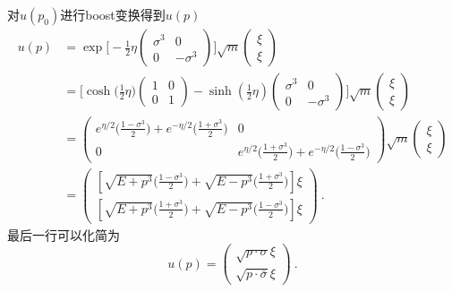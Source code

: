 \begin{exercise}{对$u(p_0)$进行boost变换得到$u(p)$}
\begin{align}\nonumber
u(p) & = \exp \bigg[ - \frac{1}{2} \eta \begin{pmatrix}
\sigma^3 & 0 \\ 
0 & - \sigma^3
\end{pmatrix} \bigg] \sqrt{m} \begin{pmatrix}
\xi \\ \xi
\end{pmatrix} \\ \nonumber
& = \bigg[ \cosh\big(\frac{1}{2}\eta\big)\begin{pmatrix}
1 & 0 \\
0 & 1
\end{pmatrix} - \sinh (\frac{1}{2}\eta) \begin{pmatrix}
\sigma^3 & 0 \\ \nonumber
0 & - \sigma^3
\end{pmatrix} \bigg]\sqrt{m} \begin{pmatrix}
\xi \\ \xi
\end{pmatrix} \\ \nonumber
& = \begin{pmatrix}
e^{\eta/2}\bigg(\frac{1-\sigma^3}{2}\bigg)+e^{-\eta/2}\bigg(\frac{1+\sigma^3}{2}\bigg) & 0\\
0 & e^{\eta/2}\bigg(\frac{1+\sigma^3}{2}\bigg)+e^{-\eta/2}\bigg(\frac{1-\sigma^3}{2}\bigg)
\end{pmatrix}\sqrt{m}\begin{pmatrix}
\xi \\ 
\xi
\end{pmatrix} \\\nonumber
& = \begin{pmatrix}
[\sqrt{E+p^3}\bigg(\frac{1-\sigma^3}{2}\bigg)+\sqrt{E-p^3}\bigg(\frac{1+\sigma^3}{2}\bigg)]\xi \\
[\sqrt{E+p^3}\bigg(\frac{1+\sigma^3}{2}\bigg)+\sqrt{E-p^3}\bigg(\frac{1-\sigma^3}{2}\bigg)]\xi
\end{pmatrix}~.
\end{align}
最后一行可以化简为
\begin{equation}
u(p) = \begin{pmatrix}
\sqrt{p\cdot\sigma}\xi \\
\sqrt{p\cdot\bar\sigma}\xi
\end{pmatrix}~.
\end{equation}
\end{exercise}
